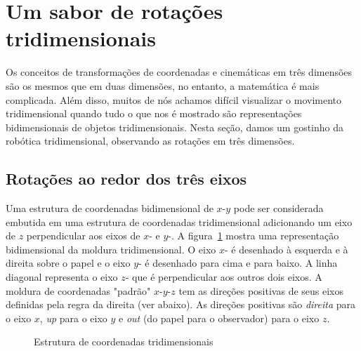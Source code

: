 
\section{Um sabor de rotações tridimensionais}\label{s.three}

Os conceitos de transformações de coordenadas e cinemáticas em três dimensões são os mesmos que em duas dimensões, no entanto, a matemática é mais complicada. Além disso, muitos de nós achamos difícil visualizar o movimento tridimensional quando tudo o que nos é mostrado são representações bidimensionais de objetos tridimensionais. Nesta seção, damos um gostinho da robótica tridimensional, observando as rotações em três dimensões.

\subsection{Rotações ao redor dos três eixos}\label{s.rotation-notation}

Uma estrutura de coordenadas bidimensional de $x$-$y$ pode ser considerada embutida em uma estrutura de coordenadas tridimensional adicionando um eixo de $z$ perpendicular aos eixos de $x$- e $y$-. A figura~\ref{fig.frame} mostra uma representação bidimensional da moldura tridimensional. O eixo $x$- é desenhado à esquerda e à direita sobre o papel e o eixo $y$- é desenhado para cima e para baixo. A linha diagonal representa o eixo $z$- que é perpendicular aos outros dois eixos. A moldura de coordenadas "padrão" $x$-$y$-$z$ tem as direções positivas de seus eixos definidas pela regra da direita (ver abaixo). As direções positivas são \textit{direita} para o eixo $x$, \textit{up} para o eixo $y$ e \textit{out} (do papel para o observador) para o eixo $z$. 

\begin{figure}
\begin{center}
\caption{Estrutura de coordenadas tridimensionais}\label{fig.frame}
\end{center}
\end{figure}

